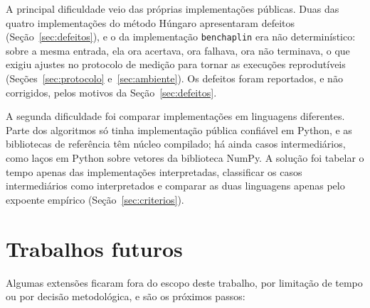 A principal dificuldade veio das próprias implementações públicas. Duas das quatro implementações do método Húngaro apresentaram defeitos (Seção~\ref{sec:defeitos}), e o da implementação \texttt{benchaplin} era não determinístico: sobre a mesma entrada, ela ora acertava, ora falhava, ora não terminava, o que exigiu ajustes no protocolo de medição para tornar as execuções reprodutíveis (Seções~\ref{sec:protocolo} e~\ref{sec:ambiente}). Os defeitos foram reportados, e não corrigidos, pelos motivos da Seção~\ref{sec:defeitos}.

A segunda dificuldade foi comparar implementações em linguagens diferentes. Parte dos algoritmos só tinha implementação pública confiável em Python, e as bibliotecas de referência têm núcleo compilado; há ainda casos intermediários, como laços em Python sobre vetores da biblioteca NumPy. A solução foi tabelar o tempo apenas das implementações interpretadas, classificar os casos intermediários como interpretados e comparar as duas linguagens apenas pelo expoente empírico (Seção~\ref{sec:criterios}).

\section{Trabalhos futuros}
\label{sec:trabalhos_futuros}

Algumas extensões ficaram fora do escopo deste trabalho, por limitação de tempo ou por decisão metodológica, e são os próximos passos:

